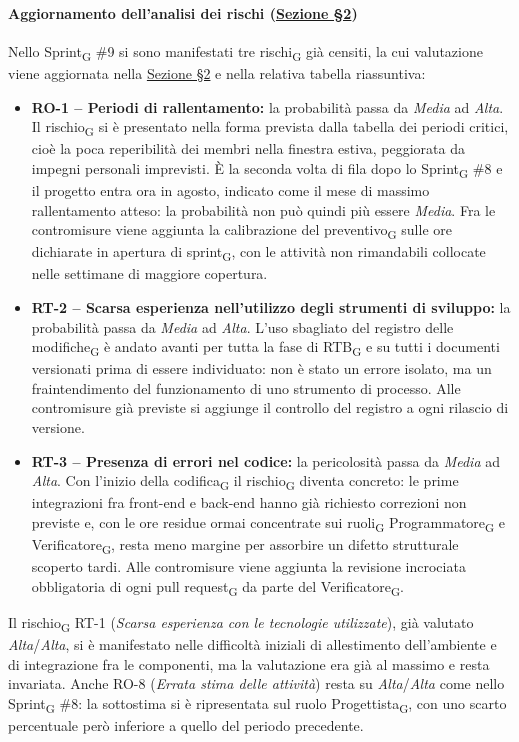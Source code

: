 ﻿\documentclass[a4paper, 10pt, colorlinks=true, linkcolor=black, urlcolor=blue, citecolor=blue, hidelinks]{article}
\begin{document}
\paragraph{Aggiornamento dell'analisi dei rischi (\hyperref[tab:gestione-rischi]{Sezione \S2})}
Nello Sprint\textsubscript{G} \#9 si sono manifestati tre rischi\textsubscript{G} già censiti, la cui valutazione viene aggiornata nella \hyperref[tab:gestione-rischi]{Sezione \S2} e nella relativa tabella riassuntiva:
\begin{itemize}
    \item \textbf{RO-1 -- Periodi di rallentamento:} la probabilità passa da \textit{Media} ad \textit{Alta}. Il rischio\textsubscript{G} si è presentato nella forma prevista dalla tabella dei periodi critici, cioè la poca reperibilità dei membri nella finestra estiva, peggiorata da impegni personali imprevisti. È la seconda volta di fila dopo lo Sprint\textsubscript{G} \#8 e il progetto entra ora in agosto, indicato come il mese di massimo rallentamento atteso: la probabilità non può quindi più essere \textit{Media}. Fra le contromisure viene aggiunta la calibrazione del preventivo\textsubscript{G} sulle ore dichiarate in apertura di sprint\textsubscript{G}, con le attività non rimandabili collocate nelle settimane di maggiore copertura.

    \item \textbf{RT-2 -- Scarsa esperienza nell'utilizzo degli strumenti di sviluppo:} la probabilità passa da \textit{Media} ad \textit{Alta}. L'uso sbagliato del registro delle modifiche\textsubscript{G} è andato avanti per tutta la fase di RTB\textsubscript{G} e su tutti i documenti versionati prima di essere individuato: non è stato un errore isolato, ma un fraintendimento del funzionamento di uno strumento di processo. Alle contromisure già previste si aggiunge il controllo del registro a ogni rilascio di versione.

    \item \textbf{RT-3 -- Presenza di errori nel codice:} la pericolosità passa da \textit{Media} ad \textit{Alta}. Con l'inizio della codifica\textsubscript{G} il rischio\textsubscript{G} diventa concreto: le prime integrazioni fra front-end e back-end hanno già richiesto correzioni non previste e, con le ore residue ormai concentrate sui ruoli\textsubscript{G} Programmatore\textsubscript{G} e Verificatore\textsubscript{G}, resta meno margine per assorbire un difetto strutturale scoperto tardi. Alle contromisure viene aggiunta la revisione incrociata obbligatoria di ogni pull request\textsubscript{G} da parte del Verificatore\textsubscript{G}.
\end{itemize}
Il rischio\textsubscript{G} RT-1 (\textit{Scarsa esperienza con le tecnologie utilizzate}), già valutato \textit{Alta}/\textit{Alta}, si è manifestato nelle difficoltà iniziali di allestimento dell'ambiente e di integrazione fra le componenti, ma la valutazione era già al massimo e resta invariata. Anche RO-8 (\textit{Errata stima delle attività}) resta su \textit{Alta}/\textit{Alta} come nello Sprint\textsubscript{G} \#8: la sottostima si è ripresentata sul ruolo Progettista\textsubscript{G}, con uno scarto percentuale però inferiore a quello del periodo precedente.
\end{document}
